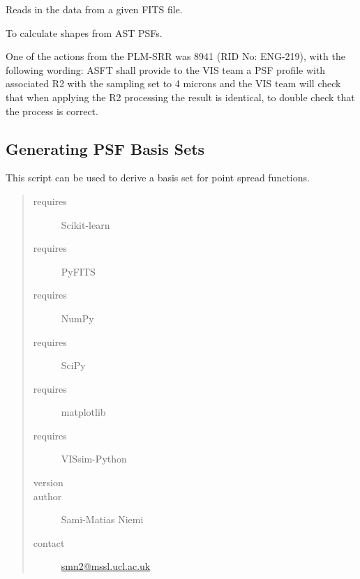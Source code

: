 \documentclass[a4paper,11pt,english]{sphinxmanual}
\begin{document}

\begin{fulllineitems}
\label{analysis:analysis.PSFproperties.readData}
Reads in the data from a given FITS file.

\end{fulllineitems}


\begin{fulllineitems}
\label{analysis:analysis.PSFproperties.shapeComparisonToAST}
To calculate shapes from AST PSFs.

One of the actions from the PLM-SRR was 8941 (RID No: ENG-219), with the
following wording:
ASFT shall provide to the VIS team a PSF profile with associated R2
with the sampling set to 4 microns and the VIS team will check that when
applying the R2 processing the result is identical, to double check that
the process is correct.

\end{fulllineitems}

\label{analysis:module-analysis.PSFbasisSets}

\subsection{Generating PSF Basis Sets}
\label{analysis:generating-psf-basis-sets}
This script can be used to derive a basis set for point spread functions.
\begin{quote}\begin{description}
\item[{requires}] \leavevmode
Scikit-learn

\item[{requires}] \leavevmode
PyFITS

\item[{requires}] \leavevmode
NumPy

\item[{requires}] \leavevmode
SciPy

\item[{requires}] \leavevmode
matplotlib

\item[{requires}] \leavevmode
VISsim-Python

\item[{version}] 

\item[{author}] \leavevmode
Sami-Matias Niemi

\item[{contact}] \leavevmode
\href{mailto:smn2@mssl.ucl.ac.uk}{smn2@mssl.ucl.ac.uk}

\end{description}\end{quote}
\end{document}
